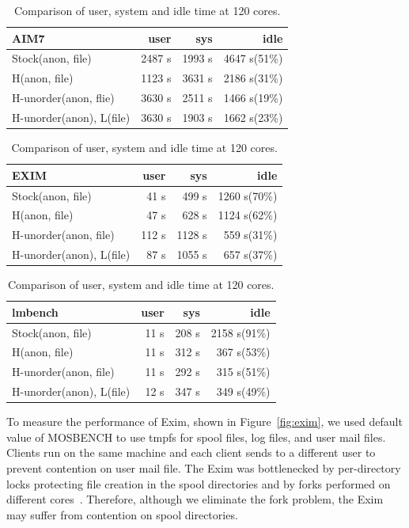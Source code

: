 \begin{table}
  \centering
  \small
  \begin{tabular}{l r r r } \toprule
    AIM7 & user & sys & idle \\
    \midrule
    Stock(anon, file) & 2487 s & 1993 s & 4647 s(51\%)\\ 
    H(anon, file) & 1123 s & 3631 s & 2186 s(31\%)\\
    H-unorder(anon, flie) & 3630 s & 2511 s & 1466 s(19\%)\\
    H-unorder(anon), L(file) & 3630 s & 1903 s & 1662 s(23\%)\\
    \bottomrule
  \end{tabular}
  \begin{tabular}{l r r r } \toprule
    EXIM & user & sys & idle \\
    \midrule
    Stock(anon, file) & 41 s & 499 s & 1260 s(70\%)\\ 
    H(anon, file) & 47 s & 628 s & 1124 s(62\%)\\
    H-unorder(anon, file) & 112 s & 1128 s & 559 s(31\%)\\
    H-unorder(anon), L(file) & 87 s & 1055 s & 657 s(37\%)\\
    \bottomrule
  \end{tabular}
  \begin{tabular}{l r r r } \toprule
    lmbench & user & sys & idle \\
    \midrule
    Stock(anon, file) & 11 s & 208 s & 2158 s(91\%)\\ 
    H(anon, file) & 11 s & 312 s & 367 s(53\%)\\
    H-unorder(anon, file) & 11 s & 292 s & 315 s(51\%)\\
    H-unorder(anon), L(file) & 12 s & 347 s & 349 s(49\%)\\
    \bottomrule
  \end{tabular}

  \caption{Comparison of user, system and idle time at 120 cores.}
  \label{tab:memuse}
\end{table}


To measure the performance of Exim, shown in Figure~\ref{fig:exim}, we
used default value of MOSBENCH to use tmpfs for
spool files, log files, and user mail files.
Clients run on the same machine and each client sends to a different user to
prevent contention on user mail file.
The Exim was bottlenecked by per-directory locks protecting file creation in
the spool directories and by forks performed on different
cores~\cite{SilasBoydWickizer2010LinuxScales48}.
Therefore, although we eliminate the fork problem, the Exim may suffer from
contention on spool directories. 

